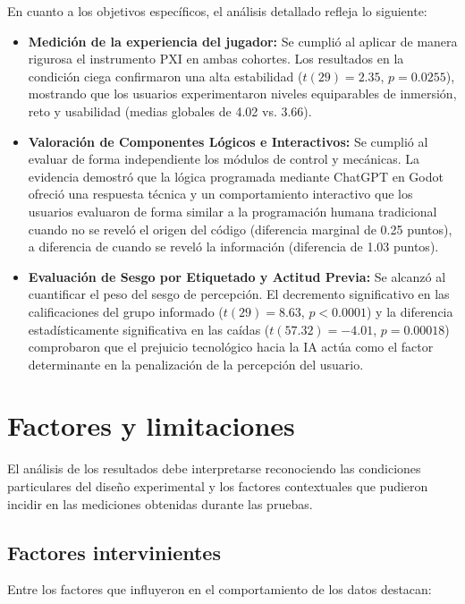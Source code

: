 En cuanto a los objetivos específicos, el análisis detallado refleja lo siguiente:

\begin{itemize}
    \item \textbf{Medición de la experiencia del jugador:} Se cumplió al aplicar de manera rigurosa el instrumento PXI en ambas cohortes. Los resultados en la condición ciega confirmaron una alta estabilidad ($t(29) = 2.35$, $p = 0.0255$), mostrando que los usuarios experimentaron niveles equiparables de inmersión, reto y usabilidad (medias globales de 4.02 vs. 3.66).
    \item \textbf{Valoración de Componentes Lógicos e Interactivos:} Se cumplió al evaluar de forma independiente los módulos de control y mecánicas. La evidencia demostró que la lógica programada mediante ChatGPT en Godot ofreció una respuesta técnica y un comportamiento interactivo que los usuarios evaluaron de forma similar a la programación humana tradicional cuando no se reveló el origen del código (diferencia marginal de 0.25 puntos), a diferencia de cuando se reveló la información (diferencia de 1.03 puntos).  
    \item \textbf{Evaluación de Sesgo por Etiquetado y Actitud Previa:} Se alcanzó al cuantificar el peso del sesgo de percepción. El decremento significativo en las calificaciones del grupo informado ($t(29) = 8.63$, $p < 0.0001$) y la diferencia estadísticamente significativa en las caídas ($t(57.32) = -4.01$, $p = 0.00018$) comprobaron que el prejuicio tecnológico hacia la IA actúa como el factor determinante en la penalización de la percepción del usuario. 
\end{itemize}

\section{Factores y limitaciones}

El análisis de los resultados debe interpretarse reconociendo las condiciones particulares del diseño experimental y los factores contextuales que pudieron incidir en las mediciones obtenidas durante las pruebas.

\subsection{Factores intervinientes}

Entre los factores que influyeron en el comportamiento de los datos destacan:

